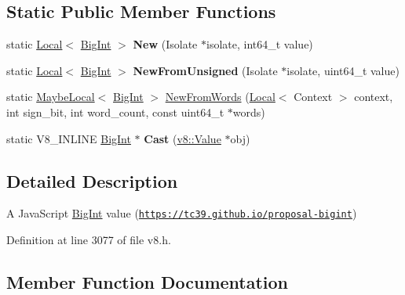 \subsection*{Static Public Member Functions}
\begin{DoxyCompactItemize}
\item 
\mbox{\label{classv8_1_1BigInt_a2ae15b635778d6c84f7715c8fb75aab6}} 
static \mbox{\hyperlink{classv8_1_1Local}{Local}}$<$ \mbox{\hyperlink{classv8_1_1BigInt}{Big\+Int}} $>$ {\bfseries New} (Isolate $\ast$isolate, int64\+\_\+t value)
\item 
\mbox{\label{classv8_1_1BigInt_afae6436f0bce457d6280a25377dca250}} 
static \mbox{\hyperlink{classv8_1_1Local}{Local}}$<$ \mbox{\hyperlink{classv8_1_1BigInt}{Big\+Int}} $>$ {\bfseries New\+From\+Unsigned} (Isolate $\ast$isolate, uint64\+\_\+t value)
\item 
static \mbox{\hyperlink{classv8_1_1MaybeLocal}{Maybe\+Local}}$<$ \mbox{\hyperlink{classv8_1_1BigInt}{Big\+Int}} $>$ \mbox{\hyperlink{classv8_1_1BigInt_a2e315509efbc08fef90ef54d7e179e4d}{New\+From\+Words}} (\mbox{\hyperlink{classv8_1_1Local}{Local}}$<$ Context $>$ context, int sign\+\_\+bit, int word\+\_\+count, const uint64\+\_\+t $\ast$words)
\item 
\mbox{\label{classv8_1_1BigInt_ad6d5b03552c5f81589d641ef2fc055d8}} 
static V8\+\_\+\+I\+N\+L\+I\+NE \mbox{\hyperlink{classv8_1_1BigInt}{Big\+Int}} $\ast$ {\bfseries Cast} (\mbox{\hyperlink{classv8_1_1Value}{v8\+::\+Value}} $\ast$obj)
\end{DoxyCompactItemize}


\subsection{Detailed Description}
A Java\+Script \mbox{\hyperlink{classv8_1_1BigInt}{Big\+Int}} value (\href{https://tc39.github.io/proposal-bigint}{\tt https\+://tc39.\+github.\+io/proposal-\/bigint}) 

Definition at line 3077 of file v8.\+h.



\subsection{Member Function Documentation}
\mbox{\label{classv8_1_1BigInt_a6478543bf9a595571d76e60fd3f2af0e}} 
